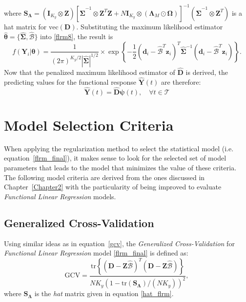 where $\bm{S}_{\bm{\Lambda}} = \left(\bm{I}_{K_y} \otimes \bm{Z} \right)\left[\hat{\bm{\Sigma}}^{-1} \otimes \bm{Z}^T\bm{Z} + N \bm{I}_{K_y} \otimes \left(\bm{\Lambda}_M \odot \bm{\Omega} \right)\right]^{-1}\left(\hat{\bm{\Sigma}}^{-1} \otimes \bm{Z}^T \right)$ is a hat matrix for $\text{vec}\left(\bm{D}\right)$. Substituting the maximum likelihood estimator $\hat{\bm{\theta}} = \{\hat{\bm{\Sigma}},\hat{\bm{\mathcal{B}}}\}$ into \eqref{flrm8}, the result is
\begin{equation}\label{flrm_final}
f(\bm{Y}_i|\bm{\theta}) = \dfrac{1}{(2 \pi)^{K_y/2} |\hat{\bm{\Sigma}}|^{1/2}} \times \exp \left\{-\dfrac{1}{2}\left(\bm{d}_{i} - \hat{\bm{\mathcal{B}}}^T\bm{z}_i\right)^T \hat{\bm{\Sigma}}^{-1} \left(\bm{d}_{i} - \hat{\bm{\mathcal{B}}}^T\bm{z}_i\right) \right\}.
\end{equation}
Now that the penalized maximum likelihood estimator of $\hat{\bm{D}}$ is derived, the predicting values for the functional response $\hat{\bm{Y}}(t)$  are therefore:
\begin{equation}
\hat{\bm{Y}}(t) = \hat{\bm{D}} \bm{\psi} (t), \quad \forall t \in \mathcal{T}
\end{equation}
 

\section{Model Selection Criteria}\label{model_crit4}
When applying the regularization method to select the statistical model (i.e. equation~\ref{flrm_final}), it makes sense to look for the selected set of model parameters that leads to the model that minimizes the value of these criteria. The following model criteria are derived from the ones discussed in Chapter~\ref{Chapter2} with the particularity of being improved to evaluate \textit{Functional Linear Regression} models.

\subsection{Generalized Cross-Validation}
Using similar ideas as in equation~\eqref{gcv}, the \textit{Generalized Cross-Validation} for \textit{Functional Linear Regression} model \ref{flrm_final} is defined as:
\begin{equation}\label{flrm_gcv}
\text{GCV} = \frac{\text{tr}\left\{\left(\bm{D} - \bm{Z} \hat{\bm{\mathcal{B}}}\right)^T \left(\bm{D} - \bm{Z} \hat{\bm{\mathcal{B}}}\right)\right\}}{NK_y \left(1-\text{tr}\left(\bm{S}_{\bm{\Lambda}}\right)/(NK_y)\right)^2},
\end{equation}
where $\bm{S}_{\bm{\Lambda}}$ is the \textit{hat} matrix given in equation \eqref{hat_flrm}.
 
